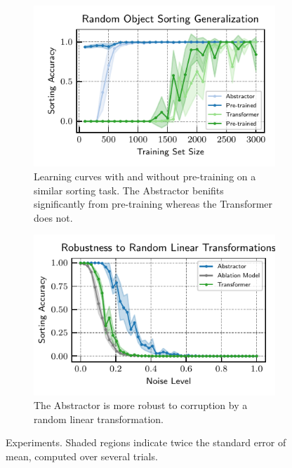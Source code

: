 \begin{figure}
    \bigskip
    \begin{subfigure}[t]{0.45\textwidth}
        \centering
        \includegraphics{figures/experiments/random_object_sorting_generalization.pdf}
        \caption{Learning curves with and without pre-training on a similar sorting task. The Abstractor benifits significantly from pre-training whereas the Transformer does not.}\label{fig:exp_object_sorting_generalization}
    \end{subfigure} \hspace{\fill}
    \begin{subfigure}[t]{0.45\textwidth}
        \centering
        \includegraphics{figures/experiments/multiplicative_robustness.pdf}
        \caption{The Abstractor is more robust to corruption by a random linear transformation.}\label{fig:exp_robustness}
    \end{subfigure}
    \caption{Experiments. Shaded regions indicate twice the standard error of mean, computed over several trials.}\label{fig:experiments}
\end{figure}


